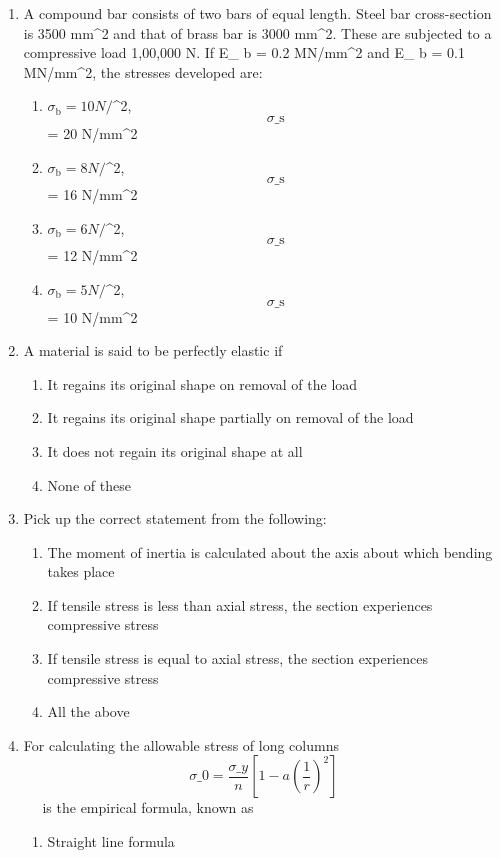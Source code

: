 \documentclass[11pt,a4paper]{article}
\begin{document}
\begin{enumerate}
\begin{enumerate}[label=\Alph*.]
\end{enumerate}
\item{A compound bar consists of two bars of equal length. Steel bar cross-section is 3500 mm\^{}2 and that of brass bar is 3000 mm\^{}2. These are subjected to a compressive load 1,00,000 N. If E\_ b = 0.2 MN/mm\^{}2 and E\_ b = 0.1 MN/mm\^{}2, the stresses developed are:
}
\begin{enumerate}[label=\Alph*.]
\item{$ {\sigma _{\text{b}}}$$ = 10 N/ $\^{}2, $${\sigma \_{\text{s}}}$$ = 20 N/mm\^{}2}
\item{$ {\sigma _{\text{b}}}$$ = 8 N/ $\^{}2, $${\sigma \_{\text{s}}}$$ = 16 N/mm\^{}2}
\item{$ {\sigma _{\text{b}}}$$ = 6 N/ $\^{}2, $${\sigma \_{\text{s}}}$$ = 12 N/mm\^{}2}
\item{$ {\sigma _{\text{b}}}$$ = 5 N/ $\^{}2, $${\sigma \_{\text{s}}}$$ = 10 N/mm\^{}2}
\end{enumerate}
\item{A material is said to be perfectly elastic if}
\begin{enumerate}[label=\Alph*.]
\item{It regains its original shape on removal of the load}
\item{It regains its original shape partially on removal of the load}
\item{It does not regain its original shape at all}
\item{None of these}
\end{enumerate}
\item{Pick up the correct statement from the following:}
\begin{enumerate}[label=\Alph*.]
\item{The moment of inertia is calculated about the axis about which bending takes place}
\item{If tensile stress is less than axial stress, the section experiences compressive stress}
\item{If tensile stress is equal to axial stress, the section experiences compressive stress}
\item{All the above}
\end{enumerate}
\item{For calculating the allowable stress of long columns $${\sigma \_0} = \frac{{{\sigma \_y}}}{n}\left[ {1 - a{{\left( {\frac{1}{r}} \right)}^2}} \right]$$ ~ ~is the empirical formula, known as
}
\begin{enumerate}[label=\Alph*.]
\item{Straight line formula}

\end{enumerate}
\end{enumerate}
\end{document}
